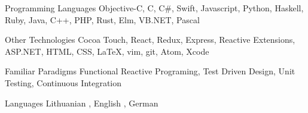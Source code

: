 

\begin{cvskills}

  \cvskill
    {Programming Languages} %
    {Objective-C, C, C\#, Swift, Javascript, Python, Haskell, Ruby, Java, C++, PHP, Rust, Elm, VB.NET, Pascal} %

  \cvskill
    {Other Technologies} %
    {Cocoa Touch, React, Redux, Express, Reactive Extensions, ASP.NET, HTML, CSS, LaTeX, vim, git, Atom, Xcode} %

  \cvskill
    {Familiar Paradigms} %
    {Functional Reactive Programing, Test Driven Design, Unit Testing, Continuous Integration} %

  \cvskill
    {Languages} %
    {Lithuanian \textit{\color{gray}{(native)}}, English \textit{\color{gray}{(fluent)}}, German \textit{\color{gray}{(basic)}}} %

\end{cvskills}
